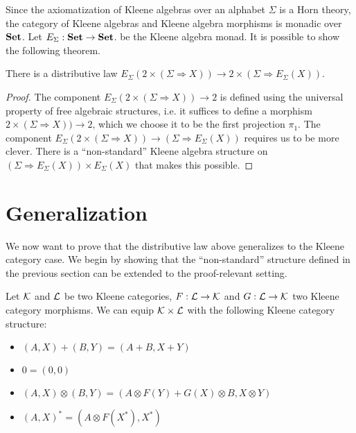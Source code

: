 \documentclass[acmsmall,anonymous,review,screen]{acmart}
\newcommand{\cat}[1]{
  \relax
  \StrLen{#1}[\arglength]
  \ifnum\arglength=1
  \mathcal{#1}
  \else
  \mathbf{#1}
  \fi
}
\newcommand{\Set}{\cat{Set}}
\begin{document}
Since the axiomatization of Kleene algebras over an alphabet $\Sigma$
is a Horn theory, the category of Kleene algebras and Kleene algebra
morphisms is monadic over $\Set$. Let $E_\Sigma : \Set \to \Set$. be the 
Kleene algebra monad. It is possible to show the following theorem.

\begin{theorem}
  There is a distributive law $E_\Sigma(2 \times (\Sigma \Rightarrow X)) \to 2 \times (\Sigma \Rightarrow E_\Sigma(X))$.
\end{theorem}
\begin{proof}
  The component $E_\Sigma(2 \times (\Sigma \Rightarrow X)) \to 2$ is
  defined using the universal property of free algebraic structures,
  i.e. it suffices to define a morphism $2 \times (\Sigma \Rightarrow
  X)) \to 2$, which we choose it to be the first projection
  $\pi_1$. The component $E_\Sigma(2 \times (\Sigma \Rightarrow X))
  \to (\Sigma \Rightarrow E_\Sigma(X))$ requires us to be more
  clever. There is a ``non-standard'' Kleene algebra structure on
  $(\Sigma \Rightarrow E_\Sigma(X)) \times E_\Sigma(X)$ that makes
  this possible.
\end{proof}

\section{Generalization}

We now want to prove that the distributive law above generalizes to
the Kleene category case. We begin by showing that the ``non-standard''
structure defined in the previous section can be extended to the
proof-relevant setting.

\begin{lemma}
  Let $\cat{K}$ and $\cat{L}$ be two Kleene categories, $F : \cat{L}
  \to \cat{K}$ and $G : \cat{L} \to \cat{K}$ two Kleene category
  morphisms. We can equip $\cat{K} \times \cat{L}$ with the following
  Kleene category structure:
  \begin{itemize}
  \item $(A, X) + (B, Y) = (A + B, X + Y)$
  \item $0 = (0, 0)$
  \item $(A, X) \otimes (B, Y) = (A \otimes F(Y) + G(X) \otimes B, X \otimes Y)$
  \item $(A, X)^* = (A \otimes F(X^*), X^*)$
  \end{itemize}
\end{lemma}
\end{document}

